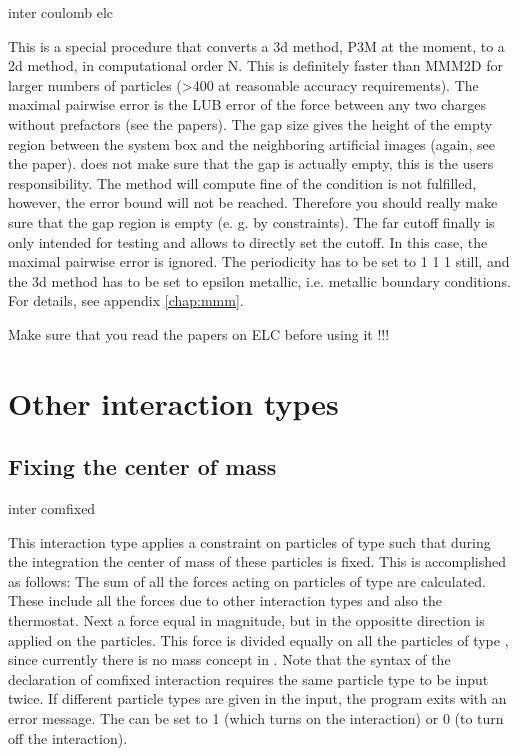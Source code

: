 \begin{essyntax}
  inter coulomb elc   
\end{essyntax}
This is a special procedure that converts a 3d method, \ie P3M at the
moment, to a 2d method, in computational order N. This is definitely
faster than MMM2D for larger numbers of particles (>400 at reasonable
accuracy requirements). The maximal pairwise error is the LUB error of
the force between any two charges without prefactors (see the papers).
The gap size gives the height of the empty region between the system
box and the neighboring artificial images (again, see the paper).
\es{} does not make sure that the gap is actually empty, this is the
users responsibility. The method will compute fine of the condition is
not fulfilled, however, the error bound will not be reached. Therefore
you should really make sure that the gap region is empty (e. g. by
constraints). The far cutoff finally is only intended for testing and
allows to directly set the cutoff. In this case, the maximal pairwise
error is ignored. The periodicity has to be set to 1 1 1 still, and
the 3d method has to be set to epsilon metallic, i.e.  metallic
boundary conditions. For details, see appendix \vref{chap:mmm}.

Make sure that you read the papers on ELC before using it !!!

\section{Other interaction types}
\label{sec:inter-other}

\subsection{Fixing the center of mass}
\begin{essyntax}
  inter  
  comfixed 
\end{essyntax}
This interaction type applies a constraint on particles of type
 such that during the integration the
center of mass of these particles is fixed. This is accomplished as
follows: The sum of all the forces acting on particles of type
 are calculated. These include all the
forces due to other interaction types and also the thermostat. Next a
force equal in magnitude, but in the oppositte direction is applied on
the particles. This force is divided equally on all the particles of
type , since currently there is no mass
concept in \es. Note that the syntax of the declaration of comfixed
interaction requires the same particle type to be input twice. If
different particle types are given in the input, the program exits
with an error message. The  can be set to 1 (which
turns on the interaction) or 0 (to turn off the interaction).

